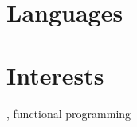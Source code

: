 \documentclass[10pt]{article}
\begin{document}
\section{Languages}



\makeatletter
\renewcommand{\@bibunitname}{\jobname.\the\@bibunitauxcnt}
\makeatother

\begin{bibunit}
  \renewcommand\refname{Selected Publications and Presentations}
  \let\originalbibitem\bibitem
  \def\bibitem#1#2\par{%
    \noexpandarg
    \originalbibitem{#1}
    \par}
  {\footnotesize \putbib[cv]}
\end{bibunit}

\vspace{-0.5em}

\section{Interests}
\interests{}, functional programming

\vspace{-0.5em}

\footerResume

\pagestyle{myheadings}

\end{document}
